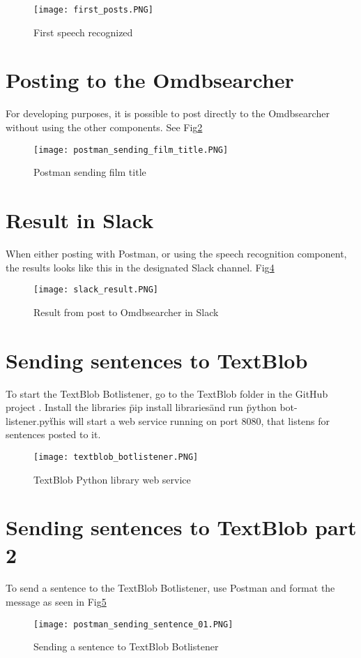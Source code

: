 \documentclass[11pt,fleqn]{book} %
\begin{document}
\begin{figure}[]
  \centering
   \texttt{[image: first\_posts.PNG]}
  \caption{First speech recognized}
  \label{fig:first-posts}
\end{figure}


\newpage
\section{Posting to the Omdbsearcher}
For developing purposes, it is possible to post directly to the Omdbsearcher without using the other components. See Fig\ref{fig:postman-film}

\begin{figure}[]
  \centering
   \texttt{[image: postman\_sending\_film\_title.PNG]}
  \caption{Postman sending film title}
  \label{fig:postman-film}
\end{figure}

\newpage
\section{Result in Slack}
When either posting with Postman, or using the speech recognition component, the results looks like this in the designated Slack channel. Fig\ref{fig:slack-result}

\begin{figure}[]
  \centering
   \texttt{[image: slack\_result.PNG]}
  \caption{Result from post to Omdbsearcher in Slack}
  \label{fig:slack-result}
\end{figure}

\newpage
\section{Sending sentences to TextBlob}
To start the TextBlob Botlistener, go to the TextBlob folder in the GitHub project \cite{Github2017GitHubProject}. Install the libraries \"pip install libraries\" and run \"python bot-listener.py\" this will start a web service running on port 8080, that listens for sentences posted to it.
\begin{figure}[]
  \centering
   \texttt{[image: textblob\_botlistener.PNG]}
  \caption{TextBlob Python library web service}
  \label{fig:slack-result}
\end{figure}

\newpage
\section{Sending sentences to TextBlob part 2}
To send a sentence to the TextBlob Botlistener, use Postman and format the message as seen in Fig\ref{fig:sending-botlistener}
\begin{figure}[]
  \centering
   \texttt{[image: postman\_sending\_sentence\_01.PNG]}
  \caption{Sending a sentence to TextBlob Botlistener}
  \label{fig:sending-botlistener}
\end{figure}
\end{document}
